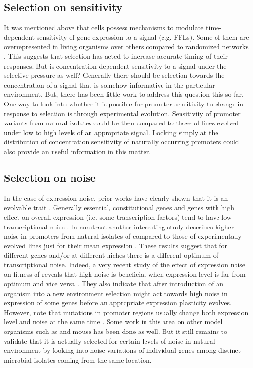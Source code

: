 \subsection{Selection on sensitivity}
It was mentioned above that cells possess mechanisms to modulate time-dependent sensitivity of gene expression to a signal (e.g. FFLs).
Some of them are overrepresented in living organisms over others compared to randomized networks \cite{shen2002network, mangan2003structure}.
This suggests that selection has acted to increase accurate timing of their responses.
But is concentration-dependent sensitivity to a signal under the selective pressure as well?
Generally there should be selection towards the concentration of a signal that is somehow informative in the particular environment.
But, there has been little work to address this question this so far.
One way to look into whether it is possible for promoter sensitivity to change in response to selection is through experimental evolution.
Sensitivity of promoter variants from natural isolates could be then compared to those of lines evolved under low to high levels of an appropriate signal.
Looking simply at the distribution of concentration sensitivity of naturally occurring promoters could also provide an useful information in this matter.

\subsection{Selection on noise}
In the case of expression noise, prior works have clearly shown that it is an evolvable trait \cite{richard2014does}.
Generally essential, constitutional genes and genes with high effect on overall expression (i.e. some transcription factors) tend to have low transcriptional noise \cite{silander2012genome, metzger2015selection}.
In constrast another interesting study describes higher noise in promoters from natural isolates of  compared to those of experimentally evolved lines just for their mean expression \cite{wolf2015expression}.
These results suggest that for different genes and/or at different niches there is a different optimum of transcriptional noise.
Indeed, a very recent study of the effect of expression noise on fitness of  reveals that high noise is beneficial when expression level is far from optimum and vice versa \cite{duveau2018fitness}.
They also indicate that after introduction of an organism into a new environment selection might act towards high noise in expression of some genes before an appropriate expression plasticity evolves.
However, note that mutations in promoter regions usually change both expression level and noise at the same time \cite{metzger2015selection}.
Some work in this area on other model organisms such as  \cite{schor2017promoter} and mouse \cite{barroso2017evolution} has been done as well.
But it still remains to validate that it is actually selected for certain levels of noise in natural environment by looking into noise variations of individual genes among distinct microbial isolates coming from the same location.

